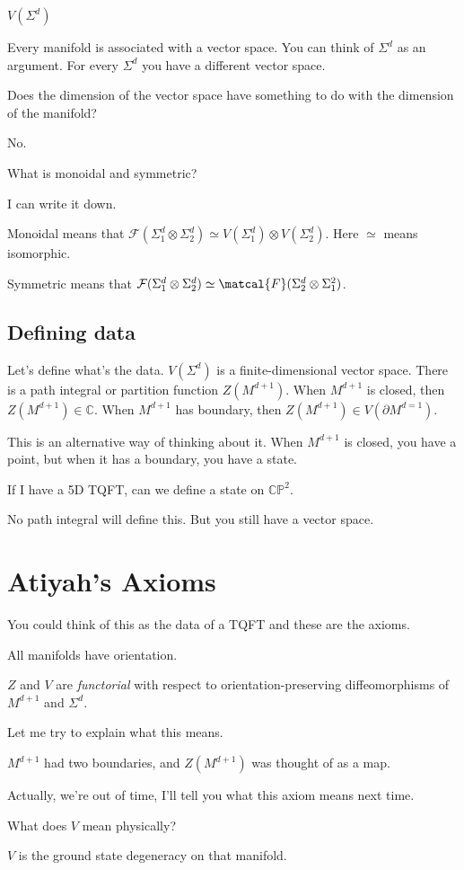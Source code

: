 \begin{question}
    $V(\Sigma^d)$
\end{question}
Every manifold is associated with a vector space.
You can think of $\Sigma^d$ as an argument.
For every $\Sigma^d$ you have a different vector space.

\begin{question}
    Does the dimension of the vector space have something to do with the
    dimension of the manifold?
\end{question}
No.

\begin{question}
    What is monoidal and symmetric?
\end{question}
I can write it down.

Monoidal means that
$\mathcal{F}(\Sigma_1^d\otimes \Sigma_2^d)
\simeq
V(\Sigma_1^d)\otimes V(\Sigma_2^d)$.
Here $\simeq$ means isomorphic.

Symmetric means that
$\mathcal{F}(\Sigma_1^d\otimes\Sigma_2^d)\simeq
\matcal{F}(\Sigma_2^d\otimes\Sigma_1^2)$.


\subsection{Defining data}
Let's define what's the data.
$V(\Sigma^d)$ is a finite-dimensional vector space.
There is a path integral or partition function $Z(M^{d+1})$.
When $M^{d+1}$ is closed,
then $Z(M^{d+1})\in\mathbb{C}$.
When $M^{d+1}$ has boundary, then
$Z(M^{d+1})\in V(\partial M^{d=1})$.

This is an alternative way of thinking about it.
When $M^{d+1}$ is closed, you have a point,
but when it has a boundary, you have a state.

\begin{question}
    If I have a 5D TQFT,
    can we define a state on $\mathbb{CP}^2$.
\end{question}
No path integral will define this.
But you still have a vector space.

\section{Atiyah's Axioms}
You could think of this as the data of a TQFT
and these are the axioms.

\begin{axiom}
    All manifolds have orientation.
\end{axiom}

\begin{axiom}
    $Z$ and $V$ are \emph{functorial} with respect to orientation-preserving
    diffeomorphisms of $M^{d+1}$ and $\Sigma^d$.
\end{axiom}
Let me try to explain what this means.

$M^{d+1}$ had two boundaries,
and $Z(M^{d+1})$ was thought of as a map.

Actually, we're out of time,
I'll tell you what this axiom means next time.

\begin{question}
    What does $V$ mean physically?
\end{question}
$V$ is the ground state degeneracy on that manifold.
